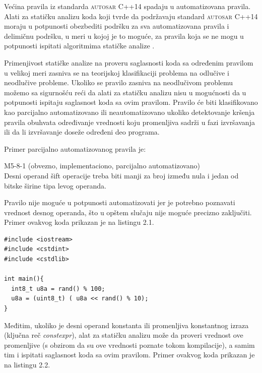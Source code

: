 \documentclass[12pt,oneside]{memoir}
\begin{document}
\indent
Većina pravila iz standarda \textsc{autosar} C++14 spadaju u automatizovana pravila. Alati za statičku analizu koda koji tvrde da podržavaju standard \textsc{autosar} C++14 moraju u potpunosti obezbediti podršku za sva automatizovana pravila i delimičnu podršku, u meri u kojoj je to moguće, za pravila koja se ne mogu u potpunosti ispitati algoritmima statičke analize \cite{AutosarGuidelines}.

\indent
Primenjivost statičke analize na proveru saglasnosti koda sa određenim pravilom u velikoj meri zasniva se na teorijskoj klasifikaciji problema
na odlučive i neodlučive probleme. Ukoliko se pravilo zasniva na neodlučivom problemu možemo sa sigurnošću reći da alati za statičku analizu nisu u mogućnosti da u potpunosti ispitaju saglasnost koda sa ovim pravilom. Pravilo će biti klasifikovano kao parcijalno automatizovano ili neautomatizovano ukoliko detektovanje kršenja pravila obuhvata određivanje vrednosti koju promenljiva sadrži u fazi izvr\v{s}avanja ili da li izvr\v{s}avanje doseže određeni deo programa.

Primer parcijalno automatizovanog pravila je: 

\begin{center}

\begin{tcolorbox}
 M5-8-1 (obvezno, implementaciono, parcijalno automatizovano) \\
Desni operand šift operacije treba biti manji za broj između nula i jedan
od bitske širine tipa levog operanda.

\end{tcolorbox}
\end{center}
  \noindent
  Pravilo nije moguće u potpunosti automatizovati jer je potrebno poznavati vrednost desnog operanda, što u opštem slučaju nije
  moguće precizno zaključiti. Primer ovakvog koda prikazan je na listingu 2.1. \\


\begin{lstlisting}[style=customc, caption={K\^{o}d za koji stati\v{c}ka analiza u op\v{s}tem slu\v{c}aju ne mo\v{z}e da d\^{a} precizne rezultate.},label={lst:label1}]
#include <iostream>
#include <cstdint>
#include <cstdlib>

int main(){
  int8_t u8a = rand() % 100;
  u8a = (uint8_t) ( u8a << rand() % 10);
}
\end{lstlisting}
Međitim, ukoliko je desni operand konstanta ili promenljiva konstantnog izraza (klju\v{c}na re\v{c} \textit{constexpr}), alat za stati\v{c}ku analizu mo\v{z}e da proveri vrednost ove promenljive (s obzirom da su ove vrednosti poznate tokom kompilacije), a samim tim i ispitati saglasnost koda sa ovim pravilom.
  Primer ovakvog koda prikazan je na listingu 2.2. \\
\end{document}
